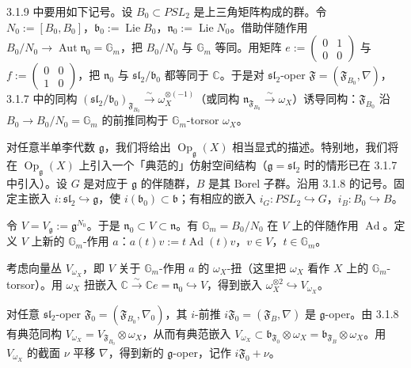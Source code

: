  3.1.9 中要用如下记号。设 $B_0 \subset PSL_2$ 是上三角矩阵构成的群。令 $N_0 := [B_0,B_0]$，$\mathfrak{b}_0 := \operatorname{Lie} B_0$，$\mathfrak{n}_0 := \operatorname{Lie} N_0$。借助伴随作用 $B_0/N_0 \to \operatorname{Aut}\mathfrak{n}_0 = \mathbb{G}_m$，把 $B_0/N_0$ 与 $\mathbb{G}_m$ 等同。用矩阵 $e := \begin{pmatrix}0&1\\0&0\end{pmatrix}$ 与 $f := \begin{pmatrix}0&0\\1&0\end{pmatrix}$，把 $\mathfrak{n}_0$ 与 $\mathfrak{sl}_2/\mathfrak{b}_0$ 都等同于 $\mathbb{C}$。于是对 $\mathfrak{sl}_2$-oper $\mathfrak{F} = (\mathfrak{F}_{B_0},\nabla)$，3.1.7 中的同构 $(\mathfrak{sl}_2/\mathfrak{b}_0)_{\mathfrak{F}_{B_0}} \xrightarrow{\sim} \omega_X^{\otimes(-1)}$（或同构 $\mathfrak{n}_{\mathfrak{F}_{B_0}} \xrightarrow{\sim} \omega_X$）诱导同构：$\mathfrak{F}_{B_0}$ 沿 $B_0 \to B_0/N_0 = \mathbb{G}_m$ 的前推同构于 $\mathbb{G}_m$-torsor $\omega_X$。

 对任意半单李代数 $\mathfrak{g}$，我们将给出 $\operatorname{Op}_{\mathfrak{g}}(X)$ 相当显式的描述。特别地，我们将在 $\operatorname{Op}_{\mathfrak{g}}(X)$ 上引入一个「典范的」仿射空间结构（$\mathfrak{g} = \mathfrak{sl}_2$ 时的情形已在 3.1.7 中引入）。设 $G$ 是对应于 $\mathfrak{g}$ 的伴随群，$B$ 是其 Borel 子群。沿用 3.1.8 的记号。固定主嵌入 $i: \mathfrak{sl}_2 \hookrightarrow \mathfrak{g}$，使 $i(\mathfrak{b}_0) \subset \mathfrak{b}$；有相应的嵌入 $i_G: PSL_2 \hookrightarrow G$，$i_B: B_0 \hookrightarrow B$。

令 $V = V_{\mathfrak{g}} := \mathfrak{g}^{N_0}$。于是 $\mathfrak{n}_0 \subset V \subset \mathfrak{n}$。有 $\mathbb{G}_m = B_0/N_0$ 在 $V$ 上的伴随作用 $\operatorname{Ad}$。定义 $V$ 上新的 $\mathbb{G}_m$-作用 $a$：$a(t)v := t\operatorname{Ad}(t)v$，$v \in V$，$t \in \mathbb{G}_m$。

考虑向量丛 $V_{\omega_X}$，即 $V$ 关于 $\mathbb{G}_m$-作用 $a$ 的 $\omega_X$-扭（这里把 $\omega_X$ 看作 $X$ 上的 $\mathbb{G}_m$-torsor）。用 $\omega_X$ 扭嵌入 $\mathbb{C} \xrightarrow{\sim} \mathbb{C}e = \mathfrak{n}_0 \hookrightarrow V$，得到嵌入 $\omega_X^{\otimes 2} \hookrightarrow V_{\omega_X}$。

对任意 $\mathfrak{sl}_2$-oper $\mathfrak{F}_0 = (\mathfrak{F}_{B_0},\nabla_0)$，其 $i$-前推 $i\mathfrak{F}_0 = (\mathfrak{F}_B,\nabla)$ 是 $\mathfrak{g}$-oper。由 3.1.8 有典范同构 $V_{\omega_X} = V_{\mathfrak{F}_{B_0}}\otimes\omega_X$，从而有典范嵌入 $V_{\omega_X} \subset \mathfrak{b}_{\mathfrak{F}_0}\otimes\omega_X = \mathfrak{b}_{\mathfrak{F}_B}\otimes\omega_X$。用 $V_{\omega_X}$ 的截面 $\nu$ 平移 $\nabla$，得到新的 $\mathfrak{g}$-oper，记作 $i\mathfrak{F}_0+\nu$。

